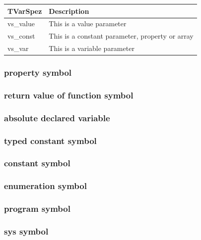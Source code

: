 \documentclass [12pt]{article}
\begin{document}
\begin{longtable}{|l|p{10cm}|}
\hline
TVarSpez & Description \\
\hline
\endhead
\hline
\endfoot
\textsf{vs{\_}value}& 
	This is a value parameter \\
\textsf{vs{\_}const}& 
	This is a constant parameter, property or array \\
\textsf{vs{\_}var}& 
	This is a variable parameter 
\end{longtable}

\subsubsection{property symbol}
\label{subsubsec:property}

\subsubsection{return value of function symbol}
\label{subsubsec:return}

\subsubsection{absolute declared variable}
\label{subsubsec:absolute}

\subsubsection{typed constant symbol}
\label{subsubsec:typed}

\subsubsection{constant symbol}
\label{subsubsec:constant}

\subsubsection{enumeration symbol}
\label{subsubsec:enumeration}

\subsubsection{program symbol}
\label{subsubsec:program}

\subsubsection{sys symbol}
\label{subsubsec:mylabel4}
\end{document}
